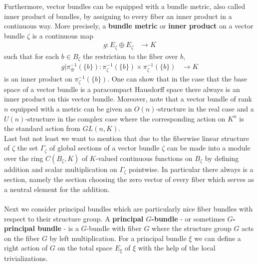 Furthermore, vector bundles can be equipped with a bundle metric, also called inner product of bundles, by assigning to every fiber an inner product in a continuous way. More precisely, a \textbf{bundle metric} or \textbf{inner product} on a vector bundle $\zeta$ is a continuous map
\begin{align*}
  g
  \colon
  E_{\zeta}
  \oplus
  E_{\zeta}
  &\to
  K
\end{align*}
such that for each $b \in B_{\zeta}$ the restriction to the fiber over $b$,
\begin{align*}
  g
  \vert
  \pi_{\oplus}^{-1}
  \left(
    \lbrace b \rbrace
  \right)
  \colon
  \pi_{\zeta}^{-1}
  \left(
    \lbrace b \rbrace
  \right)
  \times
  \pi_{\zeta}^{-1}
  \left(
    \lbrace b \rbrace
  \right)
  &\to
  K
\end{align*}
is an inner product on $\pi_{\zeta}^{-1}(\lbrace b \rbrace)$. One can show that in the case that the base space of a vector bundle is a paracompact Hausdorff space there always is an inner product on this vector bundle. Moreover, note that a vector bundle of rank $n$ equipped with a metric can be given an $O(n)$-structure in the real case and a $U(n)$-structure in the complex case where the corresponding action on $K^{n}$ is the standard action from $GL(n,K)$.
\\
Last but not least we want to mention that due to the fiberwise linear structure of $\zeta$ the set $\Gamma_{\zeta}$ of global sections of a vector bundle $\zeta$ can be made into a module over the ring $C(B_{\zeta},K)$ of $K$-valued continuous functions on $B_{\zeta}$ by defining addition and scalar multiplication on $\Gamma_{\zeta}$ pointwise. In particular there always is a section, namely the section choosing the zero vector of every fiber which serves as a neutral element for the addition.
\\\\
Next we consider principal bundles which are particularly nice fiber bundles with respect to their structure group. A \textbf{principal $G$-bundle} - or sometimes \textbf{$G$-principal bundle} - is a $G$-bundle with fiber $G$ where the structure group $G$ acts on the fiber $G$ by left multiplication. For a principal bundle $\xi$ we can define a right action of $G$ on the total space $E_{\xi}$ of $\xi$ with the help of the local trivializations.
\\
